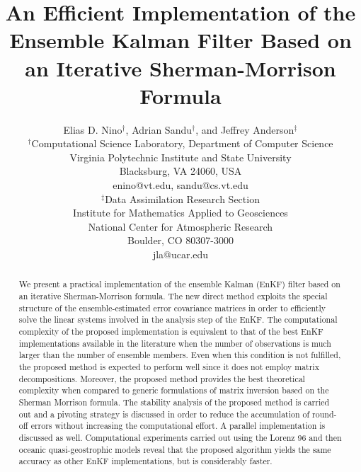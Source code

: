 \documentclass[12pt]{article}
\begin{document}
\newpage

\title{An Efficient Implementation of the Ensemble Kalman Filter Based on an Iterative Sherman-Morrison Formula}

\author{Elias D. Nino$^\dagger$, Adrian Sandu$^\dagger$, and Jeffrey Anderson$^\ddagger$ \\
$^\dagger$Computational Science Laboratory, Department of Computer Science \\
Virginia Polytechnic Institute and State University \\
Blacksburg, VA 24060, USA \\
enino@vt.edu, sandu@cs.vt.edu \\
$^\ddagger$Data Assimilation Research Section \\
Institute for Mathematics Applied to Geosciences \\
National Center for Atmospheric Research \\
Boulder, CO 80307-3000 \\
jla@ucar.edu}


\date{}
\maketitle
\tableofcontents


\begin{abstract}
We present a practical implementation of the ensemble Kalman (EnKF) filter based on an iterative Sherman-Morrison formula. 
The new direct method exploits the special structure of the ensemble-estimated error covariance matrices  in order to efficiently solve the linear systems  involved in the analysis step of the EnKF. The computational complexity of the proposed implementation is equivalent to that of the best EnKF implementations available in the literature when the number of observations is much larger than the number of ensemble members. Even when this condition is not fulfilled, the proposed method is expected to perform well since it does not employ matrix decompositions. Moreover, the proposed method provides the best theoretical complexity when compared to generic formulations of matrix inversion based on the Sherman Morrison formula. The stability analysis of the proposed method is carried out and a pivoting strategy is discussed in order to reduce the accumulation of round-off errors without increasing the computational effort. A parallel implementation is discussed as well. Computational experiments carried out using the Lorenz 96 and then oceanic quasi-geostrophic models reveal that the proposed algorithm yields the same accuracy as other EnKF implementations, but is considerably faster.
\end{abstract}
\end{document}
